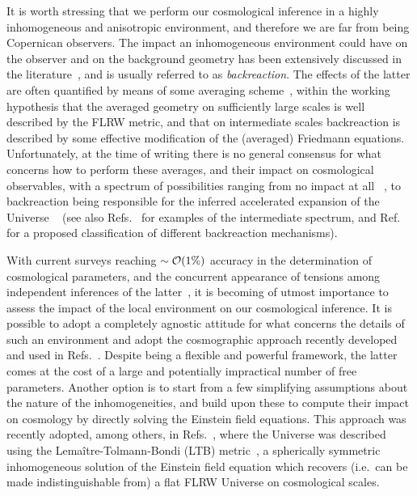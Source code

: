 \documentclass[notitlepage,nofootinbib]{revtex4-1}
\begin{document}
It is worth stressing that we perform our cosmological inference in a highly inhomogeneous and anisotropic environment, and therefore we are far from being Copernican observers. The impact an inhomogeneous environment could have on the observer and on the background geometry has been extensively discussed in the literature~\cite{1963SvA.....6..699S,Ellis:1987zz,Zalaletdinov:1992cg,Wiltshire:2011vy,Clarkson:2011zq,Buchert:2011sx,Bolejko:2016qku,Koksbang:2019cen,Koksbang:2021qqc,Schander:2021pgt}, and is usually referred to as \textit{backreaction}. The effects of the latter are often quantified by means of some averaging scheme~\cite{Coley:2005ei,Marra:2007pm,Bolejko:2017lai,Koksbang:2019glb,Buchert:2019mvq}, within the working hypothesis that the averaged geometry on sufficiently large scales is well described by the FLRW metric, and that on intermediate scales backreaction is described by some effective modification of the (averaged) Friedmann equations. Unfortunately, at the time of writing there is no general consensus for what concerns how to perform these averages, and their impact on cosmological observables, with a spectrum of possibilities ranging from no impact at all ~\cite{Ishibashi:2005sj,Green:2014aga,Macpherson:2018btl}, to backreaction being responsible for the inferred accelerated expansion of the Universe ~\cite{Wiltshire:2009db,Heinesen:2020sre} (see also Refs.~\cite{Fleury:2013sna,Bolejko:2015gmk} for examples of the intermediate spectrum, and Ref.~\cite{Kolb:2009rp} for a proposed classification of different backreaction mechanisms).

With current surveys reaching $\sim {\cal O}(1\%)$ accuracy in the determination of cosmological parameters, and the concurrent appearance of tensions among independent inferences of the latter~\cite{Planck:2018vyg,Riess:2021jrx,DES:2021wwk}, it is becoming of utmost importance to assess the impact of the local environment on our cosmological inference. 
It is possible to adopt a completely agnostic attitude for what concerns the details of such an environment and adopt the cosmographic approach recently developed and used in Refs.~\cite{Heinesen:2020bej,Heinesen:2020pms,Macpherson:2021gbh,Heinesen:2021azp,Dhawan:2022lze}. Despite being a flexible and powerful framework, the latter comes at the cost of a large and potentially impractical number of free parameters.  Another option is to start from a few simplifying assumptions about the nature of the inhomogeneities, and build upon these to compute their impact on cosmology by directly solving the Einstein field equations. This approach was recently adopted, among others, in Refs.~\cite{Kenworthy:2019qwq,Camarena:2021mjr,Marra:2022ixf,Camarena:2022iae}, where the Universe was described using the Lema\^itre-Tolmann-Bondi (LTB) metric~\cite{Mukhanov:2005sc,Enqvist:2007vb}, a spherically symmetric inhomogeneous solution of the Einstein field equation which recovers (i.e.\ can be made indistinguishable from) a flat FLRW Universe on cosmological scales.
 
\end{document}
